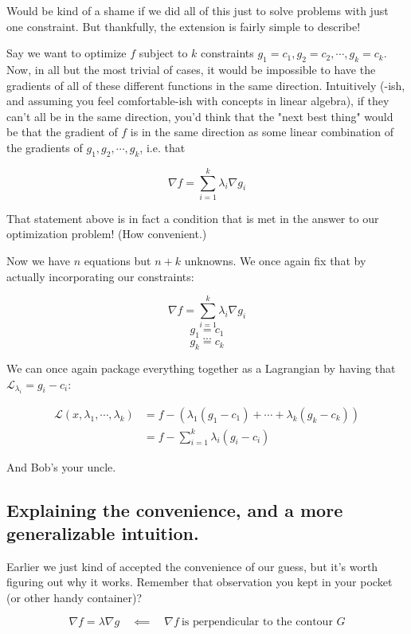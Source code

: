 \documentclass[letterpaper,12pt]{report}
\begin{document}
Would be kind of a shame if we did all of this just to solve problems
with just one constraint. But thankfully, the extension is fairly simple
to describe!

Say we want to optimize \(f\) subject to \(k\) constraints
\(g_1 = c_1, g_2 = c_2, \cdots, g_k = c_k\). Now, in all but the most
trivial of cases, it would be impossible to have the gradients of all of
these different functions in the same direction. Intuitively (-ish, and
assuming you feel comfortable-ish with concepts in linear algebra), if
they can't all be in the same direction, you'd think that the "next best
thing" would be that the gradient of \(f\) is in the same direction as
some linear combination of the gradients of \(g_1, g_2, \cdots, g_k\),
i.e. that

\[ \nabla f = \sum_{i=1}^k \lambda _i \nabla g_i \]

That statement above is in fact a condition that is met in the answer to
our optimization problem! (How convenient.)

Now we have \(n\) equations but \(n+k\) unknowns. We once again fix that
by actually incorporating our constraints:

\[ \nabla f = \sum_{i=1}^k \lambda _i \nabla g_i \] \[ g_1 = c_1 \]
\[ ... \] \[ g_k = c_k \]

We can once again package everything together as a Lagrangian by having
that \(\mathcal{L}_{\lambda _i} = g_i - c_i\):

\[\begin{split} \mathcal{L}(x, \lambda _1, \cdots, \lambda _k) &= 
                                            f - (\lambda _1 (g_1 - c_1) + \cdots + \lambda _k (g_k - c_k) ) \\
                     &= f - \sum_{i=1}^k \lambda _i (g_i - c_i) \end{split}\]

And Bob's your uncle.

\subsection{Explaining the convenience, and a more generalizable intuition.}\label{explaining-the-convenience}

Earlier we just kind of accepted the convenience of our guess, but it's
worth figuring out why it works. Remember that observation you kept in
your pocket (or other handy container)?

\[\nabla f = \lambda \nabla g \quad \impliedby \quad \nabla f \ \text{is perpendicular to the contour } G \]
\end{document}
